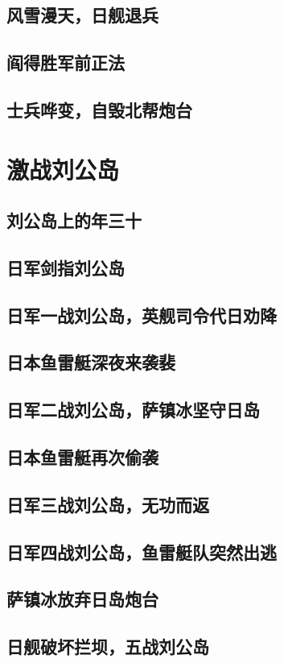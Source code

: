 \documentclass[12pt,UTF8]{ctexbook}
\begin{document}
\chapter{风雪漫天，日舰退兵}
\chapter{阎得胜军前正法}
\chapter{士兵哗变，自毁北帮炮台}


\part{激战刘公岛}

\chapter{刘公岛上的年三十}
\chapter{日军剑指刘公岛}
\chapter{日军一战刘公岛，英舰司令代日劝降}
\chapter{日本鱼雷艇深夜来袭裴}
\chapter{日军二战刘公岛，萨镇冰坚守日岛}
\chapter{日本鱼雷艇再次偷袭}
\chapter{日军三战刘公岛，无功而返}
\chapter{日军四战刘公岛，鱼雷艇队突然出逃}
\chapter{萨镇冰放弃日岛炮台}
\chapter{日舰破坏拦坝，五战刘公岛}
\end{document}
